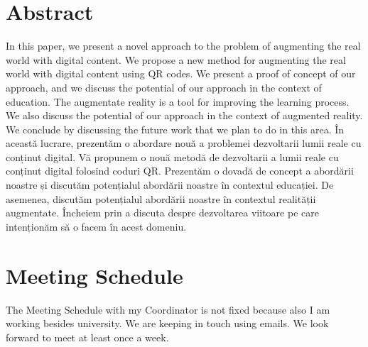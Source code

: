 \section*{Abstract}
In this paper, we present a novel approach to the problem of augmenting the real world with digital content. We propose a new method for augmenting the real world with digital content using QR codes. We present a proof of concept of our approach, and we discuss the potential of our approach in the context of education. The augmentate reality is a tool for improving the learning process. We also discuss the potential of our approach in the context of augmented reality. We conclude by discussing the future work that we plan to do in this area.
\newline
\newline
În această lucrare, prezentăm o abordare nouă a problemei dezvoltarii lumii reale cu conținut digital. Vă propunem o nouă metodă de dezvoltarii a lumii reale cu conținut digital folosind coduri QR. Prezentăm o dovadă de concept a abordării noastre și discutăm potențialul abordării noastre în contextul educației. De asemenea, discutăm potențialul abordării noastre în contextul realității augmentate. Încheiem prin a discuta despre dezvoltarea viitoare pe care intenționăm să o facem în acest domeniu.

\section*{Meeting Schedule}
The Meeting Schedule with my Coordinator is not fixed because also I am working besides university. We are keeping in touch using emails. We look forward to meet at least once a week.